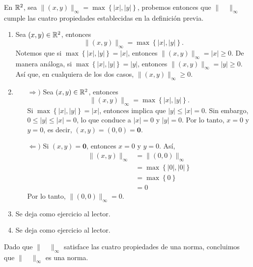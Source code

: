 \begin{example}
    En $\RR[2]$, sea $\| (x, y) \|_{\infty} = \max \left\{ |x|, |y| \right\}$, probemos entonces que $\| \quad \|_{\infty}$ cumple las cuatro propiedades establecidas en la definición previa.
    \begin{enumerate}[label=\roman*.]
        \item Sea $(x, y) \in \RR[2]$, entonces
        $$\| (x, y) \|_{\infty} = \max \left\{ |x|, |y| \right\}.$$
        Notemos que si $\max \left\{ |x|, |y| \right\} = |x|$, entonces $\| (x, y) \|_{\infty} = |x| \geq 0$. De manera análoga, si $\max \left\{ |x|, |y| \right\} = |y|$, entonces $\| (x, y) \|_{\infty} = |y| \geq 0$. Así que, en cualquiera de los dos casos, $\| (x, y) \|_{\infty} \geq 0$.
        \item \begin{enumerate}
            \item[$\Rightarrow)$] Sea $(x, y) \in \RR[2]$, entonces
            $$\| (x, y) \|_{\infty} = \max \left\{ |x|, |y| \right\}.$$
            Si $\max \left\{ |x|, |y| \right\} = |x|$, entonces implica que $|y| \leq |x| = 0$. Sin embargo, $0 \leq |y| \leq |x| = 0$, lo que conduce a $|x| = 0$ y $|y| = 0$. Por lo tanto, $x = 0$ y $y = 0$, es decir, $(x, y) = (0, 0) = \mathbf{0}$.
            \item[$\Leftarrow)$] Si $(x, y) = \mathbf{0}$, entonces $x = 0$ y $y = 0$. Así,
            \begin{align*}
                \| (x, y) \|_{\infty} & = \| (0, 0) \|_{\infty} \\
                & = \max \left\{ |0|, |0| \right\} \\
                & = \max \left\{ 0 \right\} \\
                & = 0
            \end{align*}
            Por lo tanto, $\| (0, 0) \|_{\infty} = 0$.
        \end{enumerate}
        \item Se deja como ejercicio al lector.
        \item Se deja como ejercicio al lector.
    \end{enumerate}
    Dado que $\| \quad \|_{\infty}$ satisface las cuatro propiedades de una norma, concluimos que  $\| \quad \|_{\infty}$ es una norma.
\end{example}